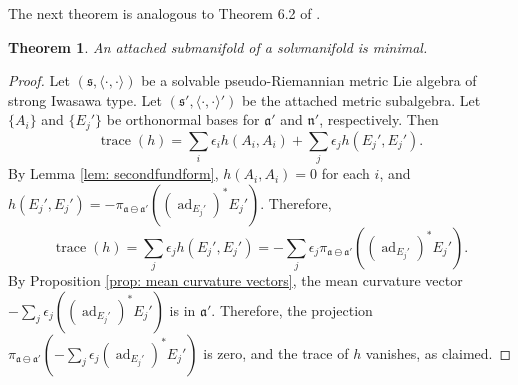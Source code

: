 \documentclass[12pt]{amsart}
\newcommand{\trace}{\operatorname{trace}}
\newcommand{\fraks}{\ensuremath{\mathfrak{s}} }
\renewcommand\a{{\mathfrak{a}}}
\newcommand\n{{\mathfrak{n}}}
\newcommand\ip{{\langle\cdot {,} \cdot\rangle}}
\newcommand\ad{\operatorname{ad}}
\theoremstyle{plain}
\newtheorem{theorem}{Theorem}
\theoremstyle{definition}
\theoremstyle{remark}
\numberwithin{equation}{section}
\numberwithin{theorem}{section}
\begin{document}
The next theorem is analogous to Theorem 6.2 of \cite{tamaru-11}.
\begin{theorem}\label{thm: minimal}
An attached submanifold  of a solvmanifold  is  minimal.
\end{theorem}
\begin{proof} Let $(\fraks,\ip)$ be a solvable pseudo-Riemannian
   metric  Lie algebra of strong Iwasawa type. 
    Let $(\fraks', \ip')$ be the attached metric subalgebra.  
    Let  $\{ A_i \}$ and $\{E_j'\}$ be orthonormal bases
for $\a'$ and $\n'$, respectively.  Then
$$\trace(h) = \sum_i \epsilon_i h(A_i,A_i) + \sum_j \epsilon_j h(E_j', E_j').$$
By Lemma \ref{lem: secondfundform}, $h(A_i,A_i)=0$ for each $i$, and 
$h(E_j', E_j') = -\pi_{\a \ominus \a'}((\ad_{E_j'})^* E_j')$. Therefore,
$$\trace(h) =  \sum_j \epsilon_j  h(E_j', E_j') = -\sum_j \epsilon_j \pi_{\a \ominus \a'}((\ad_{E_j'})^* E_j').$$
By Proposition \ref{prop: mean curvature vectors}, 
the  mean curvature vector  
$-\sum_j \epsilon_j ((\ad_{E_j'})^* E_j')$ is in $\a'$.  Therefore, 
the projection $\pi_{\a \ominus \a'} \left(-\sum_j \epsilon_j (\ad_{E_j'})^* E_j' \right)  $ is zero, 
and the trace of $h$ vanishes, as claimed.
\end{proof}
 
\end{document}

